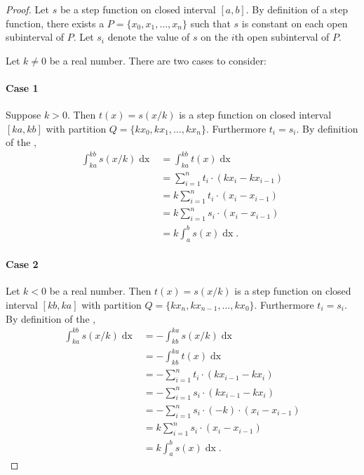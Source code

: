 \documentclass{report}
\begin{document}
\begin{proof}

  Let $s$ be a step function on closed interval $[a, b]$.
  By definition of a step function, there exists a 
    $P = \{x_0, x_1, \ldots, x_n\}$ such that $s$ is constant on each open
    subinterval of $P$.
  Let $s_i$ denote the value of $s$ on the $i$th open subinterval of $P$.

  Let $k \neq 0$ be a real number.
  There are two cases to consider:

  \paragraph{Case 1}%

    Suppose $k > 0$.
    Then $t(x) = s(x / k)$ is a step function on closed interval $[ka, kb]$
      with partition $Q = \{kx_0, kx_1, \ldots, kx_n\}$.
    Furthermore $t_i = s_i$.
    By definition of the ,
      \begin{align*}
        \int_{ka}^{kb} s(x / k) \mathop{dx}
          & = \int_{ka}^{kb} t(x) \mathop{dx} \\
          & = \sum_{i=1}^n t_i \cdot (kx_i - kx_{i-1}) \\
          & = k \sum_{i=1}^n t_i \cdot (x_i - x_{i-1}) \\
          & = k \sum_{i=1}^n s_i \cdot(x_i - x_{i-1}) \\
          & = k \int_a^b s(x) \mathop{dx}.
      \end{align*}

  \paragraph{Case 2}%

    Let $k < 0$ be a real number.
    Then $t(x) = s(x / k)$ is a step function on closed interval $[kb, ka]$
      with partition $Q = \{kx_n, kx_{n-1}, \ldots, kx_0\}$.
    Furthermore $t_i = s_i$.
    By definition of the ,
      \begin{align*}
        \int_{ka}^{kb} s(x / k) \mathop{dx}
          & = -\int_{kb}^{ka} s(x / k) \mathop{dx} \\
          & = -\int_{kb}^{ka} t(x) \mathop{dx} \\
          & = -\sum_{i=1}^n t_i \cdot (kx_{i-1} - kx_i) \\
          & = -\sum_{i=1}^n s_i \cdot (kx_{i-1} - kx_i) \\
          & = -\sum_{i=1}^n s_i \cdot (-k) \cdot (x_i - x_{i-1}) \\
          & = k \sum_{i=1}^n s_i \cdot (x_i - x_{i-1}) \\
          & = k \int_a^b s(x) \mathop{dx}.
      \end{align*}

\end{proof}
\end{document}
